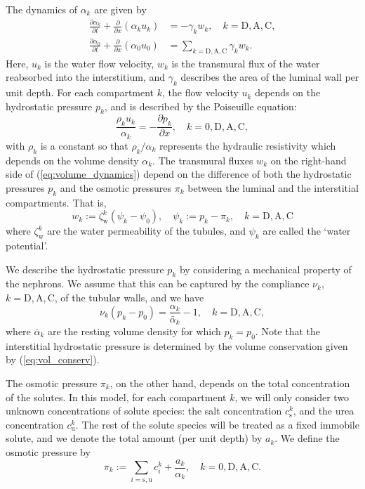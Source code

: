 \documentclass{article}
\begin{document}
The dynamics of $\alpha_k$ are given by
\begin{align}\label{eq:volume_dynamics}
    \frac{\partial \alpha_k}{\partial t} + \frac{\partial}{\partial x}\left( \alpha_k u_k \right) &= -\gamma_kw_k,\quad k=\mathrm{D},\mathrm{A},\mathrm{C},\\
    \frac{\partial \alpha_0}{\partial t} + \frac{\partial }{\partial x}\left( \alpha_0 u_0 \right) &= \sum_{k=\mathrm{D},\mathrm{A},\mathrm{C}} \gamma_kw_k.
\end{align}
Here, $u_k$ is the water flow velocity, $w_k$ is the transmural flux of the water reabsorbed into the interstitium, and $\gamma_k$ describes the area of the luminal wall per unit depth.
For each compartment $k$, the flow velocity $u_k$ depends on the hydrostatic pressure $p_k$, and is described by the Poiseuille equation:
\begin{equation}
    \frac{\rho_k u_k}{\alpha_k} = -\frac{\partial p_k}{\partial x},\quad k=0,\mathrm{D},\mathrm{A},\mathrm{C},
\end{equation}
    with $\rho_k$ is a constant so that $\rho_k/\alpha_k$ represents the hydraulic resistivity which depends on the volume density $\alpha_k$.
The transmural fluxes $w_k$ on the right-hand side of (\ref{eq:volume_dynamics}) depend on the difference of both the hydrostatic pressures $p_k$ and the osmotic pressures $\pi_k$ between the luminal and the interstitial compartments.
That is,
\begin{equation}
    w_k := \zeta_\mathrm{w}^k\left( \psi_k - \psi_0 \right),\quad \psi_k:=p_k - \pi_k,\quad k=\mathrm{D},\mathrm{A},\mathrm{C}
\end{equation}
    where $\zeta_\mathrm{w}^k$ are the water permeability of the tubules, and $\psi_k$ are called the `water potential'.

We describe the hydrostatic pressure $p_k$ by considering a mechanical property of the nephrons.
We assume that this can be captured by the compliance $\nu_k$, $k=\mathrm{D},\mathrm{A},\mathrm{C}$, of the tubular walls, and we have
\begin{equation}
    \nu_k(p_k - p_0) = \frac{\alpha_k}{\bar{\alpha}_k} - 1,\quad k=\mathrm{D},\mathrm{A},\mathrm{C},
\end{equation}
where $\bar{\alpha}_k$ are the resting volume density for which $p_k = p_0$.
Note that the interstitial hydrostatic pressure is determined by the volume conservation given by (\ref{eq:vol_conserv}).

The osmotic pressure $\pi_k$, on the other hand, depends on the total concentration of the solutes.
In this model, for each compartment $k$, we will only consider two unknown concentrations of solute species: the salt concentration $c_\mathrm{s}^k$, and the urea concentration $c_\mathrm{u}^k$.
The rest of the solute species will be treated as a fixed immobile solute, and we denote the total amount (per unit depth) by $a_k$.
We define the osmotic pressure by
\begin{equation}
    \pi_k:= \sum_{i=\mathrm{s},\mathrm{u}}c_i^k+\frac{a_k}{\alpha_k},\quad k=0,\mathrm{D},\mathrm{A},\mathrm{C}.
\end{equation}
\end{document}
